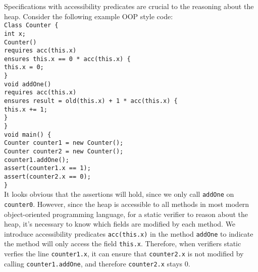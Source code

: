 \documentclass {article}
\begin{document}
Specifications with accessibility predicates are crucial to the reasoning about the heap. Consider the following example OOP style code:\\
\texttt{\noindent Class Counter \{  \\
\setlength\parindent{24pt}
\indent int x;\\
\indent Counter() \\
\indent \indent requires acc(this.x)\\
\indent \indent ensures this.x == 0 * acc(this.x) \{\\
\indent \indent this.x = 0;\\
\indent \}\\
\indent void addOne() \\
\indent \indent requires acc(this.x)\\
\indent \indent ensures result = old(this.x) + 1 * acc(this.x) \{\\
\indent \indent this.x += 1;\\
\indent \}\\
\} \\
void main() \{ \\
\indent Counter counter1 = new Counter();\\
\indent Counter counter2 = new Counter();\\
\indent counter1.addOne();\\
\indent assert(counter1.x == 1);\\
\indent assert(counter2.x == 0);\\
\} \\
}
It looks obvious that the assertions will hold, since we only call \texttt{addOne} on \texttt{counter0}. However, since the heap is accessible to all methods in most modern object-oriented programming language, for a static verifier to reason about the heap, it's necessary to know which fields are modified by each method. We introduce accessibility predicates \texttt{acc(this.x)} in the method \texttt{addOne} to indicate the method will only access the field \texttt{this.x}. Therefore, when verifiers static verfies the line \texttt{counter1.x}, it can ensure that \texttt{counter2.x} is not modified by calling \texttt{counter1.addOne}, and therefore \texttt{counter2.x} stays 0. \\
\end{document}
